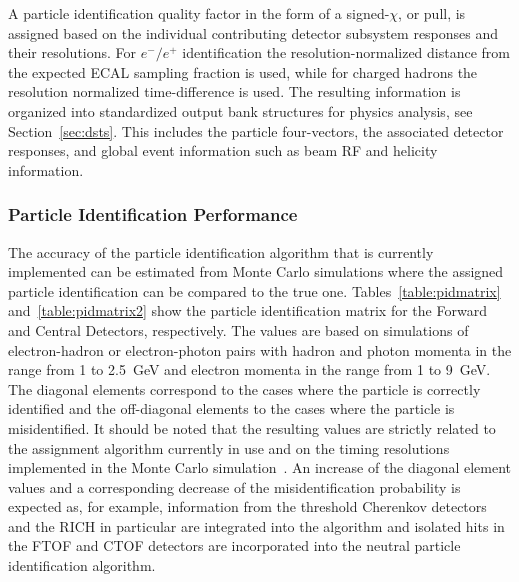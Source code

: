 A particle identification quality factor in the form of a signed-$\chi$, or pull, is assigned based on the individual
contributing detector subsystem responses and their resolutions. For $e^-/e^+$ identification the
resolution-normalized distance from the expected ECAL sampling fraction is used, while for charged hadrons the
resolution normalized time-difference is used. The resulting information is organized into standardized output
bank structures for physics analysis, see Section~\ref{sec:dsts}. This includes the particle four-vectors, the
associated detector responses, and global event information such as beam RF and helicity information.

\subsubsection{Particle Identification Performance}

The accuracy of the particle identification algorithm that is currently implemented can be estimated from
Monte Carlo simulations where the assigned particle identification can be compared to the true one.
Tables~\ref{table:pidmatrix} and~\ref{table:pidmatrix2} show the particle identification matrix for the Forward
and Central Detectors, respectively. The values are based on simulations of electron-hadron or electron-photon
pairs with hadron and photon momenta in the range from 1 to 2.5~GeV and electron momenta in the range from 1 to
9~GeV. The diagonal elements correspond to the cases where the particle is correctly identified and the off-diagonal
elements to the cases where the particle is misidentified. It should be noted that the resulting values are strictly
related to the assignment algorithm currently in use and on the timing resolutions implemented in the Monte Carlo
simulation~\cite{sim-nim}. An increase of the diagonal element values and a corresponding decrease of the
misidentification probability is expected as, for example, information from the threshold Cherenkov detectors and
the RICH in particular are integrated into the algorithm and isolated hits in the FTOF and CTOF detectors are
incorporated into the neutral particle identification algorithm.

